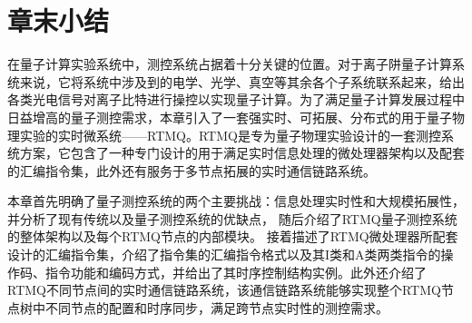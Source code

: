 




\newpage
\section[章末小结]{章末小结}

在量子计算实验系统中，测控系统占据着十分关键的位置。对于离子阱量子计算系统来说，它将系统中涉及到的电学、光学、真空等其余各个子系统联系起来，给出各类光电信号对离子比特进行操控以实现量子计算。为了满足量子计算发展过程中日益增高的量子测控需求，本章引入了一套强实时、可拓展、分布式的用于量子物理实验的实时微系统——RTMQ。RTMQ是专为量子物理实验设计的一套测控系统方案，它包含了一种专门设计的用于满足实时信息处理的微处理器架构以及配套的汇编指令集，此外还有服务于多节点拓展的实时通信链路系统。

本章首先明确了量子测控系统的两个主要挑战：信息处理实时性和大规模拓展性，并分析了现有传统以及量子测控系统的优缺点，
随后介绍了RTMQ量子测控系统的整体架构以及每个RTMQ节点的内部模块。
接着描述了RTMQ微处理器所配套设计的汇编指令集，介绍了指令集的汇编指令格式以及其I类和A类两类指令的操作码、指令功能和编码方式，并给出了其时序控制结构实例。此外还介绍了RTMQ不同节点间的实时通信链路系统，该通信链路系统能够实现整个RTMQ节点树中不同节点的配置和时序同步，满足跨节点实时性的测控需求。

